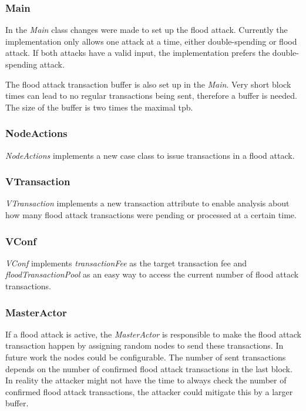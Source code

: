 \subsubsection{Main}
In the \textit{Main} class changes were made to set up the flood attack. Currently the implementation only allows one attack at a time, either double-spending or flood attack. If both attacks have a valid input, the implementation prefers the double-spending attack.

The flood attack transaction buffer is also set up in the \textit{Main}. Very short block times can lead to no regular transactions being sent, therefore a buffer is needed. The size of the buffer is two times the maximal tpb.

\subsubsection{NodeActions}
\textit{NodeActions} implements a new case class to issue transactions in a flood attack.

\subsubsection{VTransaction}
\textit{VTransaction} implements a new transaction attribute to enable analysis about how many flood attack transactions were pending or processed at a certain time.

\subsubsection{VConf}
\textit{VConf} implements \textit{transactionFee} as the target transaction fee and \textit{floodTransactionPool} as an easy way to access the current number of flood attack transactions.

\subsubsection{MasterActor}
If a flood attack is active, the \textit{MasterActor} is responsible to make the flood attack transaction happen by assigning random nodes to send these transactions. In future work the nodes could be configurable. The number of sent transactions depends on the number of confirmed flood attack transactions in the last block. In reality the attacker might not have the time to always check the number of confirmed flood attack transactions, the attacker could mitigate this by a larger buffer.

